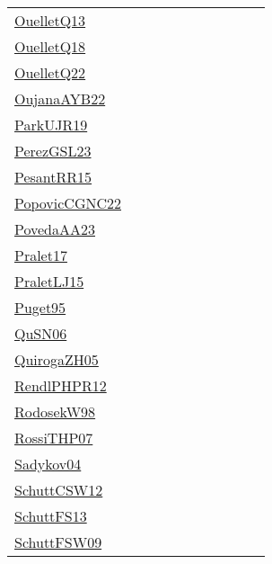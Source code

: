 {\begin{longtable}{p{3cm}p{4cm}p{2cm}p{2cm}p{2cm}p{2cm}p{2cm}p{2cm}p{2cm}p{2cm}}
\href{papers/OuelletQ13.pdf}{OuelletQ13}~\cite{OuelletQ13} &  &  &  &  &  &  &  &  & \\
\href{papers/OuelletQ18.pdf}{OuelletQ18}~\cite{OuelletQ18} &  &  &  &  &  &  &  &  & \\
\href{papers/OuelletQ22.pdf}{OuelletQ22}~\cite{OuelletQ22} &  &  &  &  &  &  &  &  & \\
\href{papers/OujanaAYB22.pdf}{OujanaAYB22}~\cite{OujanaAYB22} &  &  &  &  &  &  &  &  & \\
\href{papers/ParkUJR19.pdf}{ParkUJR19}~\cite{ParkUJR19} &  &  &  &  &  &  &  &  & \\
\href{papers/PerezGSL23.pdf}{PerezGSL23}~\cite{PerezGSL23} &  &  &  &  &  &  &  &  & \\
\href{papers/PesantRR15.pdf}{PesantRR15}~\cite{PesantRR15} &  &  &  &  &  &  &  &  & \\
\href{papers/PopovicCGNC22.pdf}{PopovicCGNC22}~\cite{PopovicCGNC22} &  &  &  &  &  &  &  &  & \\
\href{papers/PovedaAA23.pdf}{PovedaAA23}~\cite{PovedaAA23} &  &  &  &  &  &  &  &  & \\
\href{papers/Pralet17.pdf}{Pralet17}~\cite{Pralet17} &  &  &  &  &  &  &  &  & \\
\href{papers/PraletLJ15.pdf}{PraletLJ15}~\cite{PraletLJ15} &  &  &  &  &  &  &  &  & \\
\href{papers/Puget95.pdf}{Puget95}~\cite{Puget95} &  &  &  &  &  &  &  &  & \\
\href{papers/QuSN06.pdf}{QuSN06}~\cite{QuSN06} &  &  &  &  &  &  &  &  & \\
\href{papers/QuirogaZH05.pdf}{QuirogaZH05}~\cite{QuirogaZH05} &  &  &  &  &  &  &  &  & \\
\href{papers/RendlPHPR12.pdf}{RendlPHPR12}~\cite{RendlPHPR12} &  &  &  &  &  &  &  &  & \\
\href{papers/RodosekW98.pdf}{RodosekW98}~\cite{RodosekW98} &  &  &  &  &  &  &  &  & \\
\href{papers/RossiTHP07.pdf}{RossiTHP07}~\cite{RossiTHP07} &  &  &  &  &  &  &  &  & \\
\href{papers/Sadykov04.pdf}{Sadykov04}~\cite{Sadykov04} &  &  &  &  &  &  &  &  & \\
\href{papers/SchuttCSW12.pdf}{SchuttCSW12}~\cite{SchuttCSW12} &  &  &  &  &  &  &  &  & \\
\href{papers/SchuttFS13.pdf}{SchuttFS13}~\cite{SchuttFS13} &  &  &  &  &  &  &  &  & \\
\href{papers/SchuttFSW09.pdf}{SchuttFSW09}~\cite{SchuttFSW09} &  &  &  &  &  &  &  &  & \\

\end{longtable}}
